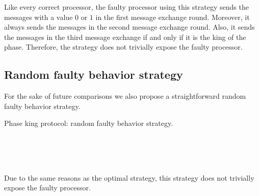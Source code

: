Like every correct processor, the faulty processor using this strategy sends the messages with a value $0$ or $1$ in the first message exchange round. Moreover, it always sends the messages in the second message exchange round. Also, it sends the messages in the third message exchange if and only if it is the king of the phase. Therefore, the strategy does not trivially expose the faulty processor.

\subsection{Random faulty behavior strategy}
For the sake of future comparisons we also propose a straightforward random faulty behavior strategy.
\begin{breakablealgorithm}
  \caption{Phase king protocol: random faulty behavior strategy.}
  \begin{algorithmic}[1]
            \State {}
        \EndFor
        \\
        \State {}
            \State {}
        \EndFor
        \\ 
        \State {}
                \State {}
            \EndFor
        \EndIf
        \\
        \State {}
    \EndFor
  \end{algorithmic}
\end{breakablealgorithm}
Due to the same reasons as the optimal strategy, this strategy does not trivially expose the faulty processor.

